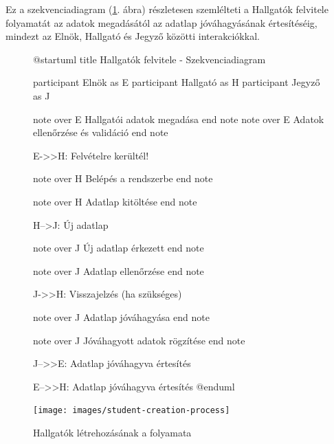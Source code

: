 \documentclass[a4paper,12pt]{article}
\begin{document}
Ez a szekvenciadiagram (\ref{fig:student-creation-process}. ábra) részletesen szemlélteti a Hallgatók felvitele folyamatát az adatok megadásától az adatlap jóváhagyásának értesítéséig, mindezt az Elnök, Hallgató és Jegyző közötti interakciókkal.

\begin{figure}
	\centering
	\begin{plantuml}
@startuml
title Hallgatók felvitele - Szekvenciadiagram

participant Elnök as E
participant Hallgató as H
participant Jegyző as J

note over E
Hallgatói adatok megadása
end note
note over E
Adatok ellenőrzése és validáció
end note

E->>H: Felvételre kerültél!

note over H 
Belépés a rendszerbe
end note

note over H 
Adatlap kitöltése
end note

H-->J: Új adatlap

note over J 
Új adatlap érkezett
end note

note over J 
Adatlap ellenőrzése
end note

J->>H: Visszajelzés (ha szükséges)

note over J 
Adatlap jóváhagyása
end note

note over J 
Jóváhagyott adatok rögzítése
end note

J-->>E: Adatlap jóváhagyva értesítés

E-->>H: Adatlap jóváhagyva értesítés
@enduml
	\end{plantuml}
	\texttt{[image: images/student-creation-process]}
	\caption{Hallgatók létrehozásának a folyamata}
	\label{fig:student-creation-process}
\end{figure}
\end{document}
